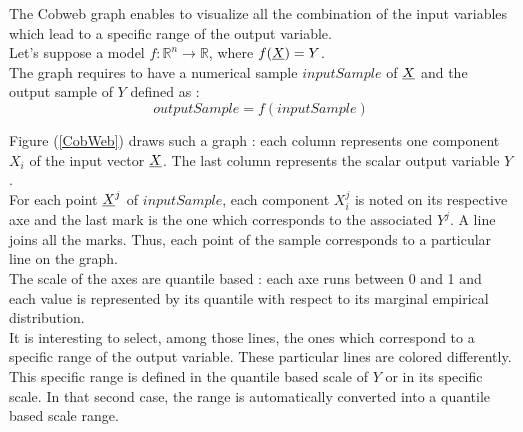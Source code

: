 \renewcommand{\filename}{docUC_CentralUncertainty_CobWebGraph}
\renewcommand{\filetitle}{UC : Sensitivity analysis : Cobweb graph}

\HeaderIIILevel




The Cobweb graph enables to visualize all the combination of the input variables which lead to a specific range of the output variable.\\

Let's suppose a model $f : \mathbb{R}^n \longrightarrow  \mathbb{R}$, where $f({\underline{X}}) = Y$.\\

The graph requires to have a numerical sample $inputSample$ of ${\underline{X}}$ and the output sample of $Y$ defined as :
$$
outputSample = f(inputSample)
$$

Figure (\ref{CobWeb}) draws such a graph : each column represents one component $X_i$ of the input vector ${\underline{X}}$. The last column represents the scalar output variable $Y$.  \\
For each point ${\underline{X}}^j$ of $inputSample$, each component $X_i^j$ is noted on its respective axe and the last mark is the one which corresponds to the associated $Y^j$. A line joins all the marks. Thus, each point of the sample corresponds to a particular line on the graph.\\

The scale of the axes are quantile based :  each axe runs between 0 and 1 and each value is represented by its quantile with respect to its marginal empirical distribution.\\

It is interesting to select, among those lines, the ones which correspond to a specific range of the output variable. These particular lines are colored differently. This specific range is defined in the quantile based scale of $Y$ or in its specific scale. In that second case, the range is automatically converted into a quantile based scale range.\\

